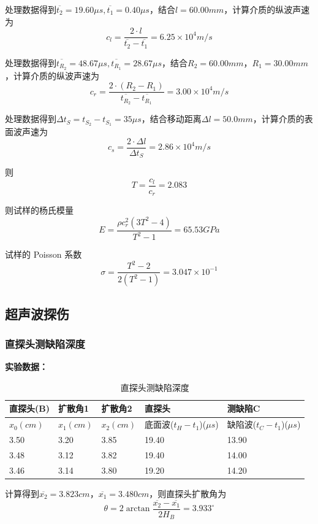 \documentclass[UTF8]{ctexart}
\newcommand\df[2]{\dfrac{#1}{#2}}
\begin{document}
处理数据得到\(\overline{t_2}=19.60\mu s,\overline{t_1}=0.40\mu s\)，结合\(l=60.00mm\)，计算介质的纵波声速为\[c_l=\df{2\cdot l}{\overline{t_2}-\overline{t_1}}=6.25\times 10^{4}m/s\]

处理数据得到\(\overline{t_{R_2}}=48.67\mu s,\overline{t_{R_1}}=28.67\mu s\)，结合\(R_2=60.00mm\)，\(R_1=30.00mm\)，计算介质的纵波声速为\[c_r=\df{2\cdot(R_2-R_1)}{\overline{t_{R_2}}-\overline{t_{R_1}}}=3.00\times 10^{4}m/s\]

处理数据得到\(\Delta{t_S}=t_{S_2}-t_{S_1}=35\mu s\)，结合移动距离\(\Delta l=50.0mm\)，计算介质的表面波声速为\[c_s=\df{2\cdot \Delta l}{\Delta{t_S}}=2.86\times 10^{4}m/s\]

则\[T=\df{c_l}{c_r}=2.083\]

则试样的杨氏模量\[E=\df{\rho c_r^2(3T^2-4)}{T^2-1}=65.53GPa\]

试样的 Poisson 系数\[\sigma=\df{T^2-2}{2(T^2-1)}=3.047\times 10^{-1}\]

\subsection{超声波探伤}

\subsubsection{直探头测缺陷深度}

\textbf{实验数据：}

\begin{table}[!ht]
    \centering
    \caption{直探头测缺陷深度}
    \begin{tabular}{|l|l|l|l|l|}
    \hline
        \textbf{直探头(B)} & \textbf{扩散角1} & \textbf{扩散角2} & \textbf{直探头} & \textbf{测缺陷C} \\ \hline
        \(x_0(cm)\) & \(x_1(cm)\) & \(x_2(cm)\) & 底面波(\(t_H-t_1\))(\(\mu s\)) & 缺陷波(\(t_C-t_1\))(\(\mu s\)) \\ \hline
        3.50 & 3.20 & 3.85 & 19.40 & 13.90 \\ \hline
        3.48 & 3.12 & 3.82 & 19.40 & 14.00 \\ \hline
        3.46 & 3.14 & 3.80 & 19.20 & 14.20 \\ \hline
    \end{tabular}
    \label{table2}
\end{table}

计算得到\(\overline{x_2}=3.823cm\)，\(\overline{x_1}=3.480cm\)，则直探头扩散角为\[\theta=2\arctan\df{\overline{x_2}-\overline{x_1}}{2H_B}=3.933^{\circ}\]
\end{document}
